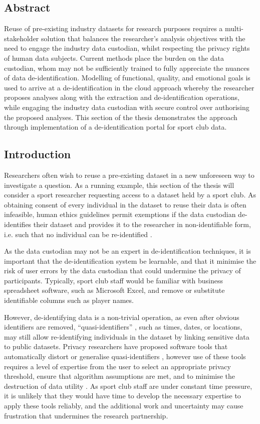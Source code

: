 \subsection{Abstract}

Reuse of pre-existing industry datasets for research purposes requires a
multi-stakeholder solution that balances the researcher's analysis
objectives with the need to engage the industry data custodian, whilst
respecting the privacy rights of human data subjects. Current methods
place the burden on the data custodian, whom may not be sufficiently
trained to fully appreciate the nuances of data de-identification.
Modelling of functional, quality, and emotional goals is used to arrive at a
de-identification in the cloud approach whereby the researcher
proposes analyses along with the extraction and de-identification
operations, while engaging the industry data custodian with secure
control over authorising the proposed analyses. This section of the thesis demonstrates the approach through implementation of a de-identification portal for sport club data.

\subsection{Introduction}

Researchers often wish to reuse a pre-existing dataset in a new
unforeseen way to investigate a question. As a running example, this section of the thesis will consider a sport researcher requesting access to a
dataset held by a sport club. As obtaining consent of every individual
in the dataset to reuse their data is often infeasible, human ethics
guidelines permit exemptions if the data custodian de-identifies their
dataset and provides it to the researcher in non-identifiable form, i.e.
such that no individual can be re-identified \cite{NationalStatement2015}.

As the data custodian may not be an expert in de-identification
techniques, it is important that the de-identification system be
learnable, and that it minimise the risk of user errors by the data
custodian that could undermine the privacy of participants. Typically,
sport club staff would be familiar with business spreadsheet software,
such as Microsoft Excel, and remove or substitute identifiable columns
such as player names.

However, de-identifying data is a non-trivial operation, as even after
obvious identifiers are removed, ``quasi-identifiers'' \cite{Sweeny2002}, such as
times, dates, or locations, may still allow re-identifying individuals
in the dataset by linking sensitive data to public datasets. Privacy
researchers have proposed software tools that automatically distort or
generalise quasi-identifiers \cite{LeFevre2005}, however use of these tools
requires a level of expertise from the user to select an appropriate
privacy threshold, ensure that algorithm assumptions are met, and to
minimise the destruction of data utility \cite{Brickell2008}. As sport club staff
are under constant time pressure, it is unlikely that they would have
time to develop the necessary expertise to apply these tools reliably,
and the additional work and uncertainty may cause frustration that
undermines the research partnership.

